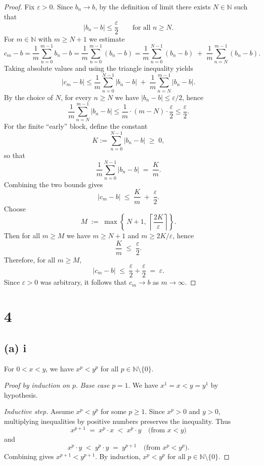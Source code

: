 \documentclass[12pt,a4paper]{article}
\theoremstyle{definition}
\theoremstyle{remark}
\begin{document}
\begin{proof}
Fix $\varepsilon>0$. Since $b_n \to b$, by the definition of limit there exists $N\in\mathbb{N}$ such that
\[
|b_n - b| \le \frac{\varepsilon}{2}
\qquad \text{for all } n \ge N.
\]
For $m\in\mathbb{N}$ with $m \ge N+1$ we estimate
\[
c_m - b
= \frac{1}{m}\sum_{n=0}^{m-1} b_n - b
= \frac{1}{m}\sum_{n=0}^{m-1} (b_n - b)
= \frac{1}{m}\sum_{n=0}^{N-1} (b_n - b) \;+\; \frac{1}{m}\sum_{n=N}^{m-1} (b_n - b).
\]
Taking absolute values and using the triangle inequality yields
\[
|c_m - b|
\le \frac{1}{m}\sum_{n=0}^{N-1} |b_n - b|
\;+\; \frac{1}{m}\sum_{n=N}^{m-1} |b_n - b|.
\]
By the choice of $N$, for every $n\ge N$ we have $|b_n - b| \le \varepsilon/2$, hence
\[
\frac{1}{m}\sum_{n=N}^{m-1} |b_n - b|
\le \frac{1}{m}\cdot (m-N)\cdot \frac{\varepsilon}{2}
\le \frac{\varepsilon}{2}.
\]
For the finite “early” block, define the constant
\[
K := \sum_{n=0}^{N-1} |b_n - b| \;\ge\; 0,
\]
so that
\[
\frac{1}{m}\sum_{n=0}^{N-1} |b_n - b| \;=\; \frac{K}{m}.
\]
Combining the two bounds gives
\[
|c_m - b| \;\le\; \frac{K}{m} \;+\; \frac{\varepsilon}{2}.
\]
Choose
\[
M \;:=\; \max\!\left\{\,N+1,\ \left\lceil \frac{2K}{\varepsilon} \right\rceil \right\}.
\]
Then for all $m \ge M$ we have $m \ge N+1$ and $m \ge 2K/\varepsilon$, hence
\[
\frac{K}{m} \;\le\; \frac{\varepsilon}{2}.
\]
Therefore, for all $m \ge M$,
\[
|c_m - b| \;\le\; \frac{\varepsilon}{2} + \frac{\varepsilon}{2} \;=\; \varepsilon.
\]
Since $\varepsilon>0$ was arbitrary, it follows that $c_m \to b$ as $m\to\infty$.
\end{proof}


\section*{4}
\subsection*{(a) i}
For $0 < x < y$, we have $x^p < y^p$ for all $p \in \mathbb{N}\setminus\{0\}$.

\begin{proof}[Proof by induction on $p$]
\medskip

\emph{Base case $p=1$.} We have $x^1 = x < y = y^1$ by hypothesis.

\emph{Inductive step.} Assume $x^p < y^p$ for some $p \ge 1$. Since $x^p>0$ and $y>0$, multiplying inequalities by positive numbers preserves the inequality. Thus
\[
x^{p+1} \;=\; x^p \cdot x \;<\; x^p \cdot y
\quad\text{(from $x<y$)}
\]
and
\[
x^p \cdot y \;<\; y^p \cdot y \;=\; y^{p+1}
\quad\text{(from $x^p<y^p$)}.
\]
Combining gives $x^{p+1} < y^{p+1}$. By induction, $x^p<y^p$ for all $p\in\mathbb{N}\setminus\{0\}$.
\end{proof}
\end{document}
